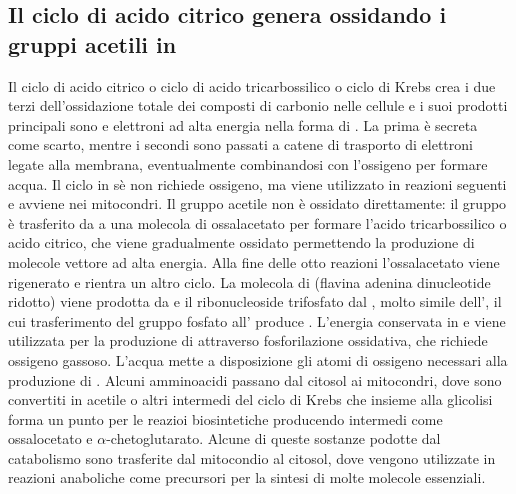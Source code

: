 \subsection{Il ciclo di acido citrico genera  ossidando i gruppi acetili in }
Il ciclo di acido citrico o ciclo di acido tricarbossilico o ciclo di Krebs crea i due terzi dell'ossidazione totale dei composti di carbonio nelle cellule e i suoi prodotti principali
sono  e elettroni ad alta energia nella forma di . La prima \`e secreta come scarto, mentre i secondi sono passati a catene di trasporto di elettroni legate alla 
membrana, eventualmente combinandosi con l'ossigeno per formare acqua. Il ciclo in s\`e non richiede ossigeno, ma viene utilizzato in reazioni seguenti e avviene nei mitocondri. Il 
gruppo acetile non \`e ossidato direttamente: il gruppo \`e trasferito da  a una molecola di ossalacetato per formare l'acido tricarbossilico o acido citrico, che viene
gradualmente ossidato permettendo la produzione di molecole vettore ad alta energia. Alla fine delle otto reazioni l'ossalacetato viene rigenerato e rientra un altro ciclo. La molecola
di  (flavina adenina dinucleotide ridotto) viene prodotta da  e il ribonucleoside trifosfato  dal , molto simile dell', il cui trasferimento 
del gruppo fosfato all' produce . L'energia conservata in  e  viene utilizzata per la produzione di  attraverso fosforilazione ossidativa, che
richiede ossigeno gassoso. L'acqua mette a disposizione gli atomi di ossigeno necessari alla produzione di . Alcuni amminoacidi passano dal citosol ai mitocondri, dove sono 
convertiti in acetile  o altri intermedi del ciclo di Krebs che insieme alla glicolisi forma un punto per le reazioi biosintetiche producendo intermedi come ossalocetato e 
$\alpha$-chetoglutarato. Alcune di queste sostanze podotte dal catabolismo sono trasferite dal mitocondio al citosol, dove vengono utilizzate in reazioni anaboliche come precursori
per la sintesi di molte molecole essenziali.
